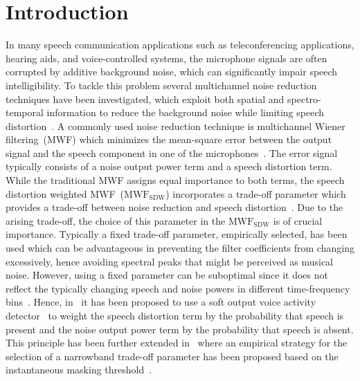 \documentclass{article}
\begin{document}
\section{Introduction}
In many speech communication applications such as teleconferencing applications, hearing aids, and voice-controlled systems, the microphone signals are often corrupted by additive background noise, which can significantly impair speech intelligibility.
To tackle this problem several multichannel noise reduction techniques have been investigated, which exploit both spatial and spectro-temporal information to reduce the background noise while limiting speech distortion~\cite{Doclo_ITSP_2002,Spriet_SP_2004,Benesty_book_2008,Gannot_book_2008,Souden_ITSP_2010}. 
A commonly used noise reduction technique is multichannel Wiener filtering~(MWF) which minimizes the mean-square error between the output signal and the speech component in one of the microphones~\cite{Doclo_SC_2007,Doclo_Chap_2010}. 
The error signal typically consists of a noise output power term and a speech distortion term.
While the traditional MWF assigns equal importance to both terms, the speech distortion weighted MWF~($\text{MWF}_{\text{SDW}}$) incorporates a trade-off parameter which provides a trade-off between noise reduction and speech distortion~\cite{Doclo_ITSP_2002,Spriet_SP_2004}. 
Due to the arising trade-off, the choice of this parameter in the $\text{MWF}_{\text{SDW}}$ is of crucial importance. \newline
Typically a fixed trade-off parameter, empirically selected, has been used which can be advantageous in preventing the filter coefficients from changing excessively, hence avoiding spectral peaks that might be perceived as musical noise. 
However, using a fixed parameter can be suboptimal since it does not reflect the typically changing speech and noise powers in different time-frequency bins~\cite{Ngo_IWAENC_2008,Ngo_ICASSP_2011,Ngo_EURASIP_2012,Defraene_ICASSP_2012}.
Hence, in~\cite{Ngo_IWAENC_2008,Ngo_ICASSP_2011,Ngo_EURASIP_2012} it has been proposed to use a soft output voice activity detector~\cite{Gazor_ITSAP_2003} to weight the speech distortion term by the probability that speech is present and the noise output power term by the probability that speech is absent.
This principle has been further extended in~\cite{Defraene_ICASSP_2012} where an empirical strategy for the selection of a narrowband trade-off parameter has been proposed based on the instantaneous masking threshold~\cite{Painter_IEEE_2000}. \newline
\end{document}
